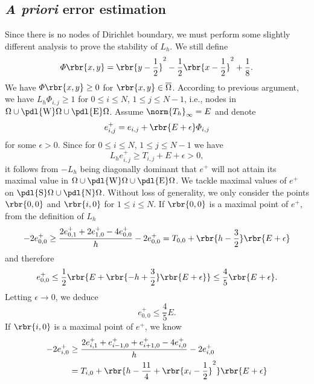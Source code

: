 \documentclass[english, nochinese]{pnote}
\newcommand\normi[1]{\norm{#1}_{\infty}}
\begin{document}
\subsection{\textit{A priori} error estimation}

Since there is no nodes of Dirichlet boundary, we must perform some slightly different analysis to prove the stability of $L_h$. We still define
\begin{equation}
\varPhi \rbr{ x, y } = \rbr{ y - \frac{1}{2} }^2 - \frac{1}{2} \rbr{ x - \frac{1}{2} }^2 + \frac{1}{8}.
\end{equation}
We have $ \varPhi \rbr{ x, y } \ge 0 $ for $ \rbr{ x, y } \in \overline{\Omega} $. According to previous argument, we have $ L_h \varPhi_{ i, j } \ge 1 $ for $ 0 \le i \le N $, $ 1 \le j \le N - 1 $, i.e., nodes in $ \Omega \cup \pdl{\text{W}} \Omega \cup \pdl{\text{E}} \Omega $. Assume $ \normi{T_h} = E $ and denote
\begin{equation}
e^+_{ i, j } = e_{ i, j } + \rbr{ E + \epsilon } \varPhi_{ i, j }
\end{equation}
for some $ \epsilon > 0 $. Since for $ 0 \le i \le N $, $ 1 \le j \le N - 1 $ we have
\begin{equation}
L_h e^+_{ i, j } \ge T_{ i, j } + E + \epsilon > 0,
\end{equation}
it follows from $-L_h$ being diagonally dominant that $e^+$ will not attain its maximal value in $ \Omega \cup \pdl{\text{W}} \Omega \cup \pdl{\text{E}} \Omega $. We tackle maximal values of $e^+$ on $ \pdl{\text{S}} \Omega \cup \pdl{\text{N}} \Omega $. Without loss of generality, we only consider the points $ \rbr{ 0, 0 } $ and $ \rbr{ i, 0 } $ for $ 1 \le i \le N $. If $ \rbr{ 0, 0 } $ is a maximal point of $e^+$, from the definition of $L_h$
\begin{equation}
- 2 e^+_{ 0, 0 } \ge \frac{ 2 e^+_{ 0, 1 } + 2 e^+_{ 1, 0 } - 4 e^+_{ 0, 0 } }{h} - 2 e^+_{ 0, 0 } = T_{ 0, 0 } + \rbr{ h - \frac{3}{2} } \rbr{ E + \epsilon }
\end{equation}
and therefore
\begin{equation}
e^+_{ 0, 0 } \le \frac{1}{2} \rbr{ E + \rbr{ -h + \frac{3}{2} } \rbr{ E + \epsilon } } \le \frac{4}{5} \rbr{ E + \epsilon }.
\end{equation}
Letting $ \epsilon \rightarrow 0 $, we deduce
\begin{equation}
e^+_{ 0, 0 } \le \frac{4}{5} E.
\end{equation}
If $ \rbr{ i, 0 } $ is a maximal point of $e^+$, we know
\begin{equation}
\begin{split}
-2 e^+_{ i, 0 } &\ge  \frac{ 2 e^+_{ i, 1 } + e^+_{ i - 1, 0 } + e^+_{ i + 1, 0 } - 4 e^+_{ i, 0 } }{h} - 2 e^+_{ i, 0 } \\
&= T_{ i, 0 } + \rbr{ h - \frac{11}{4} + \rbr{ x_i - \frac{1}{2} }^2 } \rbr{ E + \epsilon }
\end{split}
\end{equation}
\end{document}
